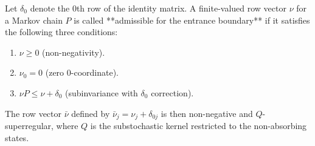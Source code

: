 Let $\delta_0$ denote the $0$th row of the identity matrix. A finite-valued row vector $\nu$ for a Markov chain $P$ is called **admissible for the entrance boundary** if it satisfies the following three conditions:
\begin{enumerate}
\item[(1)] $\nu \geq 0$ (non-negativity).
\item[(2)] $\nu_0 = 0$ (zero $0$-coordinate).
\item[(3)] $\nu P \leq \nu + \delta_0$ (subinvariance with $\delta_0$ correction).
\end{enumerate}
The row vector $\bar{\nu}$ defined by $\bar{\nu}_j = \nu_j + \delta_{0j}$ is then non-negative and $Q$-superregular, where $Q$ is the substochastic kernel restricted to the non-absorbing states.
